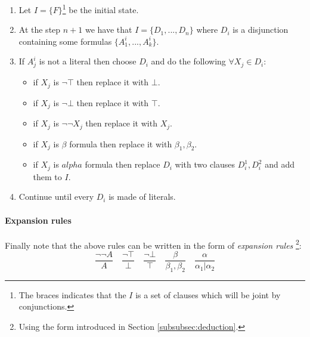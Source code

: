 \documentclass[10pt,a4paper]{article}
\begin{document}
\begin{enumerate}
\item Let $I=\lbrace F \rbrace$\footnote{The braces indicates that the $I$ is a set of clauses which will be joint by conjunctions.} be the initial state.
\item At the step $n+1$ we have that $I=\lbrace D_1,...,D_n \rbrace$ where $D_i$ is a disjunction containing some formulas $\lbrace A_1^i,...,A_k^i\rbrace$. 
\item If $A^i_j$ is not a literal then choose $D_i$ and do the following $\forall X_j \in D_i$:

	\begin{itemize}
	
	\item if $X_j$ is $\neg \top$ then replace it with $\bot$.
	\item if $X_j$ is $\neg \bot$ then replace it with $\top$.
	\item if $X_j$ is $\neg \neg X_j$ then replace it with $X_j$.
	\item if $X_j$ is $\beta$ formula then replace it with $\beta_1,\beta_2$.
	\item if $X_j$ is $alpha$ formula then replace $D_i$ with two clauses $D_i^1,D_i^2$ and add them to $I$. 

	\end{itemize}
	
\item Continue until every $D_i$ is made of literals.

\end{enumerate}


\paragraph{Expansion rules}
Finally note that the above rules can be written in the form of \textit{expansion rules} \footnote{Using the form introduced in Section \ref{subsubsec:deduction}.}:
\[\frac{\neg\neg A}{A}\quad \frac{\neg \top}{\bot}\quad \frac{\neg \bot}{\top}\quad \frac{\beta}{\beta_1,\beta_2}\quad \frac{\alpha}{\alpha_1 |\alpha_2}\]
\end{document}
